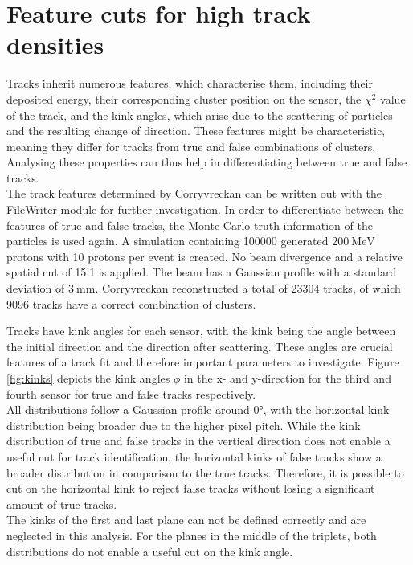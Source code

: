 
\section{Feature cuts for high track densities}\label{sec:feature}
Tracks inherit numerous features, which characterise them,
including their deposited energy, their corresponding cluster position on the sensor, the $\chi^2$ value of the track, and the kink angles, which
arise due to the scattering of particles and the resulting change of direction.
These features might be characteristic, meaning they differ for tracks from true and false combinations of clusters.
Analysing these properties can thus help in differentiating between true and false tracks. \\
The track features determined by Corryvreckan can be written out with the FileWriter module for further investigation.
In order to differentiate between the features of true and false tracks, the Monte Carlo truth information of the particles is used again.
A simulation containing 100000 generated $\SI{200}{\mega\eV}$ protons with 10 protons per event is created.
No beam divergence and a relative spatial cut of 15.1 is applied.
The beam has a Gaussian profile with a standard deviation of $\SI{3}{\milli\meter}$.
Corryvreckan reconstructed a total of 23304 tracks, of which 9096 tracks have a correct combination of clusters.

Tracks have kink angles for each sensor, with the kink being
the angle between the initial direction and the direction after scattering. These angles are crucial features of a track fit and therefore important parameters to investigate.
Figure \ref{fig:kinks} depicts the kink angles $\phi$ in the x- and y-direction for the third and fourth sensor for true and false tracks respectively. \\
All distributions follow a Gaussian profile around 0°, with the horizontal kink distribution being broader due to the higher pixel pitch.
While the kink distribution of true and false tracks in the vertical direction does not enable a useful
cut for track identification, the horizontal kinks of false tracks show a broader distribution in comparison to the true tracks. Therefore, it is
possible to cut on the horizontal kink to reject false tracks without losing a significant amount of true tracks. \\
The kinks of the first and last plane can not be defined correctly and are neglected in this analysis. For the planes in the middle of the triplets, both
distributions do not enable a useful cut on the kink angle.


